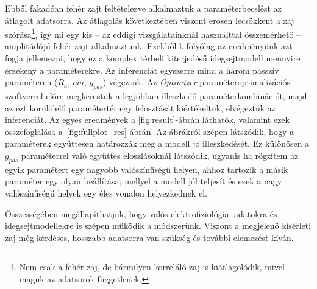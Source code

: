 Ebből fakadóan fehér zajt feltételezve alkalmaztuk a paraméterbecslést az átlagolt adatsorra. Az átlagolás következtében viszont erősen lecsökkent a zaj szórása\footnote{Nem csak a fehér zaj, de bármilyen korreláló zaj is kiátlagolódik, mivel maguk az adatsorok függetlenek.}, így mi egy kis -- az eddigi vizsgálatainknál használttal összemérhető -- amplitúdójú fehér zajt alkalmaztunk. Ezekből kifolyólag az eredményünk azt fogja jellemezni, hogy ez a komplex térbeli kiterjedésű idegsejtmodell mennyire érzékeny a paraméterekre. Az inferenciát egyszerre mind a három passzív paraméteren ($R_a$, $cm$, $g_{pas}$) végeztük. Az \textit{Optimizer}\cite{friedrich2014flexible} paraméteroptimalizációs szoftverrel előre megkerestük a legjobban illeszkedő paraméterkombinációt, majd az ezt körülölelő paramétertér egy felosztását kiértékeltük, elvégeztük az inferenciát. Az egyes eredmények a \ref{fig:result}-ábrán láthatók, valamint ezek összefoglalása a~\ref{fig:fullplot_res}-ábrán. Az ábrákról szépen látszódik, hogy a paraméterek együttesen határozzák meg a modell jó illeszkedését. Ez különösen a $g_{pas}$ paraméterrel való együttes eloszlásoknál látszódik, ugyanis ha rögzítem az egyik paramétert egy nagyobb valószínűségű helyen, ahhoz tartozik a másik paraméter egy olyan beállítása, mellyel a modell jól teljesít és ezek a nagy valószínűségű helyek egy éles vonalon helyezkednek el.

Összességében megállapíthatjuk, hogy valós elektrofiziológiai adatokra és idegsejtmodellekre is szépen működik a módszerünk. Viszont a megjelenő kísérleti zaj még kérdéses, hosszabb adatsorra van szükség és további elemezést kíván.

